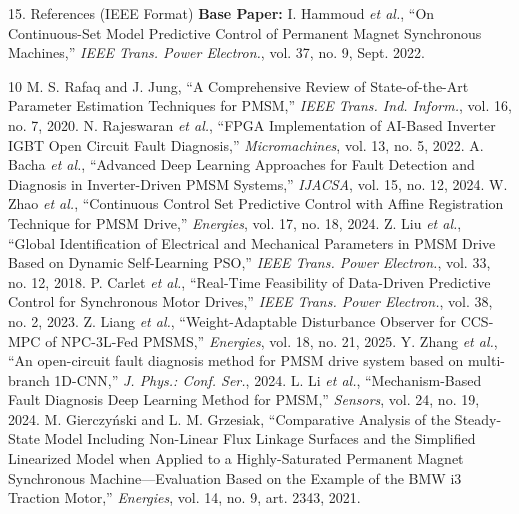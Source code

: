 \documentclass[aspectratio=169]{beamer}
\begin{document}
\begin{frame}{15. References (IEEE Format)}
    \tiny
    \textbf{Base Paper:} I. Hammoud \textit{et al.}, ``On Continuous-Set Model Predictive Control of Permanent Magnet Synchronous Machines,'' \textit{IEEE Trans. Power Electron.}, vol. 37, no. 9, Sept. 2022.
    \vspace{1.5mm}
    \begin{thebibliography}{10}
        \setlength{\itemsep}{0pt}
         M. S. Rafaq and J. Jung, ``A Comprehensive Review of State-of-the-Art Parameter Estimation Techniques for PMSM,'' \textit{IEEE Trans. Ind. Inform.}, vol. 16, no. 7, 2020.
         N. Rajeswaran \textit{et al.}, ``FPGA Implementation of AI-Based Inverter IGBT Open Circuit Fault Diagnosis,'' \textit{Micromachines}, vol. 13, no. 5, 2022.
         A. Bacha \textit{et al.}, ``Advanced Deep Learning Approaches for Fault Detection and Diagnosis in Inverter-Driven PMSM Systems,'' \textit{IJACSA}, vol. 15, no. 12, 2024.
         W. Zhao \textit{et al.}, ``Continuous Control Set Predictive Control with Affine Registration Technique for PMSM Drive,'' \textit{Energies}, vol. 17, no. 18, 2024.
         Z. Liu \textit{et al.}, ``Global Identification of Electrical and Mechanical Parameters in PMSM Drive Based on Dynamic Self-Learning PSO,'' \textit{IEEE Trans. Power Electron.}, vol. 33, no. 12, 2018.
         P. Carlet \textit{et al.}, ``Real-Time Feasibility of Data-Driven Predictive Control for Synchronous Motor Drives,'' \textit{IEEE Trans. Power Electron.}, vol. 38, no. 2, 2023.
         Z. Liang \textit{et al.}, ``Weight-Adaptable Disturbance Observer for CCS-MPC of NPC-3L-Fed PMSMS,'' \textit{Energies}, vol. 18, no. 21, 2025.
         Y. Zhang \textit{et al.}, ``An open-circuit fault diagnosis method for PMSM drive system based on multi-branch 1D-CNN,'' \textit{J. Phys.: Conf. Ser.}, 2024.
         L. Li \textit{et al.}, ``Mechanism-Based Fault Diagnosis Deep Learning Method for PMSM,'' \textit{Sensors}, vol. 24, no. 19, 2024.
         M. Gierczy\'nski and L. M. Grzesiak, ``Comparative Analysis of the Steady-State Model Including Non-Linear Flux Linkage Surfaces and the Simplified Linearized Model when Applied to a Highly-Saturated Permanent Magnet Synchronous Machine---Evaluation Based on the Example of the BMW i3 Traction Motor,'' \textit{Energies}, vol. 14, no. 9, art. 2343, 2021.
    \end{thebibliography}
\end{frame}
\end{document}
